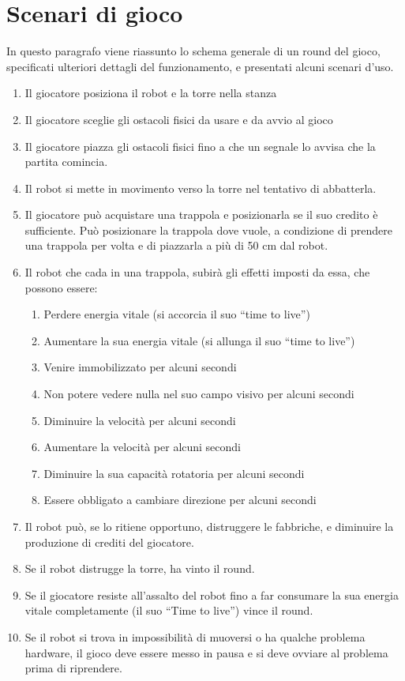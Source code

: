 \section{Scenari di gioco}
In questo paragrafo viene riassunto lo schema generale di un round del gioco, specificati ulteriori dettagli del funzionamento, e presentati alcuni scenari d'uso.
\begin{enumerate}
    \item Il giocatore posiziona il robot e la torre nella stanza
	\item Il giocatore sceglie gli ostacoli fisici da usare e da avvio al gioco
	\item Il giocatore piazza gli ostacoli fisici fino a che un segnale lo avvisa che la partita comincia.
	\item Il robot si mette in movimento verso la torre nel tentativo di abbatterla.
	\item Il giocatore può acquistare una trappola e posizionarla se il suo credito è sufficiente. Può posizionare la trappola dove vuole, a condizione di prendere una trappola per volta e di piazzarla a più di 50 cm dal robot.
	\item Il robot che cada in una trappola, subirà gli effetti imposti da essa, che possono essere:
		\begin{enumerate}
		\item Perdere energia vitale (si accorcia il suo “time to live”)
		\item Aumentare la sua energia vitale (si allunga il suo “time to live”)
		\item Venire immobilizzato per alcuni secondi
		\item Non potere vedere nulla nel suo campo visivo per alcuni secondi
		\item Diminuire la velocità per alcuni secondi
		\item Aumentare la velocità per alcuni secondi
		\item Diminuire la sua capacità rotatoria per alcuni secondi
		\item Essere obbligato a cambiare direzione per alcuni secondi
		\end{enumerate}
	\item Il robot può, se lo ritiene opportuno, distruggere le fabbriche, e diminuire la produzione di crediti del giocatore.
	\item Se il robot distrugge la torre, ha vinto il round.
	\item Se il giocatore resiste all’assalto del robot fino a far consumare la sua energia vitale completamente (il suo “Time to live”) vince il round.
	\item Se il robot si trova in impossibilità di muoversi o ha qualche problema hardware, il gioco deve essere messo in pausa e si deve ovviare al problema prima di riprendere.
	\end{enumerate}
